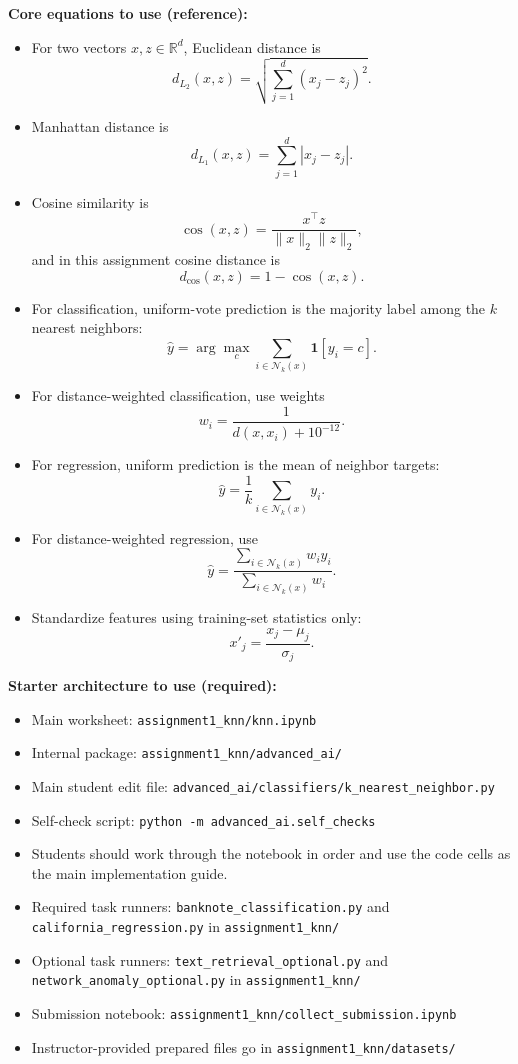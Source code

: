 \medskip
\textbf{Core equations to use (reference):}
\begin{itemize}
  \item For two vectors $x, z \in \mathbb{R}^d$, Euclidean distance is
  \[
    d_{L_2}(x,z)=\sqrt{\sum_{j=1}^{d}(x_j-z_j)^2}.
  \]
  \item Manhattan distance is
  \[
    d_{L_1}(x,z)=\sum_{j=1}^{d}|x_j-z_j|.
  \]
  \item Cosine similarity is
  \[
    \cos(x,z)=\frac{x^\top z}{\|x\|_2\|z\|_2},
  \]
  and in this assignment cosine distance is
  \[
    d_{\cos}(x,z)=1-\cos(x,z).
  \]
  \item For classification, uniform-vote prediction is the majority label among the $k$ nearest neighbors:
  \[
    \hat y = \arg\max_{c} \sum_{i \in \mathcal{N}_k(x)} \mathbf{1}[y_i=c].
  \]
  \item For distance-weighted classification, use weights
  \[
    w_i=\frac{1}{d(x,x_i)+10^{-12}}.
  \]
  \item For regression, uniform prediction is the mean of neighbor targets:
  \[
    \hat y = \frac{1}{k}\sum_{i \in \mathcal{N}_k(x)} y_i.
  \]
  \item For distance-weighted regression, use
  \[
    \hat y = \frac{\sum_{i \in \mathcal{N}_k(x)} w_i y_i}{\sum_{i \in \mathcal{N}_k(x)} w_i}.
  \]
  \item Standardize features using training-set statistics only:
  \[
    x'_j = \frac{x_j-\mu_j}{\sigma_j}.
  \]
\end{itemize}

\medskip
\textbf{Starter architecture to use (required):}
\begin{itemize}
  \item Main worksheet: \texttt{assignment1\_knn/knn.ipynb}
  \item Internal package: \texttt{assignment1\_knn/advanced\_ai/}
  \item Main student edit file: \texttt{advanced\_ai/classifiers/k\_nearest\_neighbor.py}
  \item Self-check script: \texttt{python -m advanced\_ai.self\_checks}
  \item Students should work through the notebook in order and use the code cells as the main implementation guide.
  \item Required task runners: \texttt{banknote\_classification.py} and \texttt{california\_regression.py} in \texttt{assignment1\_knn/}
  \item Optional task runners: \texttt{text\_retrieval\_optional.py} and \texttt{network\_anomaly\_optional.py} in \texttt{assignment1\_knn/}
  \item Submission notebook: \texttt{assignment1\_knn/collect\_submission.ipynb}
  \item Instructor-provided prepared files go in \texttt{assignment1\_knn/datasets/}
\end{itemize}


